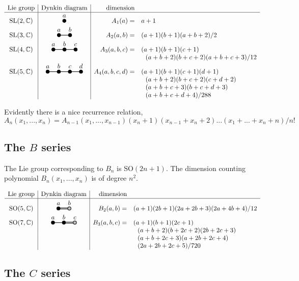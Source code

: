 \documentclass[11pt,oneside]{article}
\newcommand{\Complex}{\mathbb{C}}
\newcommand{\SL}{\mathrm{SL}}
\newcommand{\SO}{\mathrm{SO}}
\begin{document}
$$
\begin{array}{c|c|rl}
\text{Lie group} & \text{Dynkin diagram} & \text{dimension} & \\
\hline
\SL(2,\Complex)           & \DynkinAa   & A_1(a) =& a+1 \\
\SL(3,\Complex)           & \DynkinAab  & A_2(a,b) =& (a+1)(b+1)(a+b+2)/2 \\
\SL(4,\Complex)           & \DynkinAabc   & A_3(a,b,c) =& (a+1)(b+1)(c+1) \\
 & & &\ \ (a+b+2)(b+c+2)(a+b+c+3)/12 \\
\SL(5,\Complex)           & \DynkinAabcd  & A_4(a,b,c,d) =& (a+1)(b+1)(c+1)(d+1) \\
 & & &\ \ (a+b+2)(b+c+2)(c+d+2) \\
 & & &\ \ (a+b+c+3)(b+c+d+3) \\
    & & & \ \ (a+b+c+d+4)/288 \\
\end{array}
$$

Evidently there is a nice recurrence relation,
$$
    A_n(x_1,...,x_n) = A_{n-1}(x_1,...,x_{n-1})
    (x_n + 1)
    (x_{n-1} + x_n + 2)
    ...
    (x_1 + ... + x_n + n) 
    / n!
$$

\subsection{The $B$ series}

The Lie group corresponding to $B_n$ is $\SO(2n+1).$
The dimension counting polynomial $B_n(x_1,...,x_n)$ is
of degree $n^2.$

$$
\begin{array}{c|c|rl}
\text{Lie group} & \text{Dynkin diagram} & \text{dimension} & \\
\hline
\SO(5,\Complex) & \DynkinBab  & B_2(a,b) =& (a+1)(2b+1)(2a+2b+3)(2a+4b+4)/12 \\
\SO(7,\Complex) & \DynkinBabc & B_3(a,b,c) =& (a+1)(b+1)(2c+1) \\
                             & & &\ \ (a+b+2)(b+2c+2)(2b+2c+3) \\
                             & & &\ \ (a+b+2c+3)(a+2b+2c+4) \\
            & & &\ \ (2a+2b+2c+5)/720 \\
\end{array}
$$


\subsection{The $C$ series}
\end{document}
